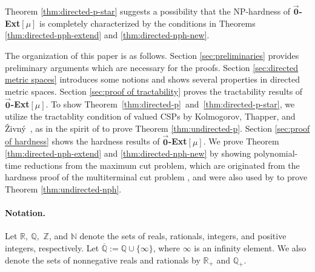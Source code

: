 \documentclass[11pt]{article}
\theoremstyle{definition}
\begin{document}
Theorem \ref{thm:directed-p-star} suggests a possibility that the NP-hardness of $\overrightarrow{\textbf{0}}$\textbf{-Ext}$[\mu]$ is completely characterized by the conditions in Theorems \ref{thm:directed-nph-extend} and \ref{thm:directed-nph-new}.


The organization of this paper is as follows. Section \ref{sec:preliminaries} provides preliminary arguments which are necessary for the proofs. Section \ref{sec:directed metric spaces} introduces some notions and shows several properties in directed metric spaces. Section \ref{sec:proof of tractability} proves the tractability results of $\overrightarrow{\textbf{0}}$\textbf{-Ext}$[\mu]$.
To show Theorem~\ref{thm:directed-p}~and~\ref{thm:directed-p-star}, we utilize the tractablity condition of valued CSPs by Kolmogorov, Thapper, and \v{Z}ivn\'{y}~\cite{kolmogorov2015}, as in the spirit of \cite{hirai2016} to prove Theorem \ref{thm:undirected-p}. Section \ref{sec:proof of hardness} shows the hardness results of $\overrightarrow{\textbf{0}}$\textbf{-Ext}$[\mu]$. We prove Theorem \ref{thm:directed-nph-extend} and \ref{thm:directed-nph-new} by showing polynomial-time reductions from the maximum cut problem, which are originated from the hardness proof of the multiterminal cut problem \cite{dahlhaus1994}, and were also used by \cite{karzanov1998,karzanov2004} to prove Theorem \ref{thm:undirected-nph}. 

\paragraph*{Notation.} Let $\mathbb{R},\ \mathbb{Q},$ $\mathbb{Z}$, and $\mathbb{N}$ denote the sets of reals, rationals, integers, and positive integers, respectively. Let $\overline{\mathbb{Q}}:=\mathbb{Q}\cup \{\infty \}$, where $\infty$ is an infinity element. We also denote the sets of nonnegative reals and rationals by $\mathbb{R}_+$ and $\mathbb{Q}_+$.
\end{document}
